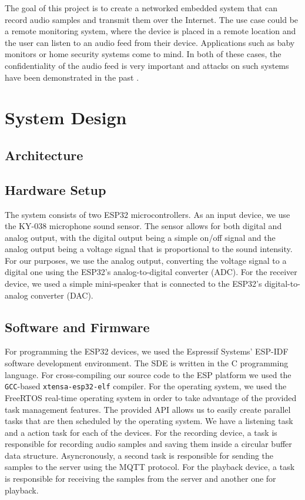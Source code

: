 \documentclass[conference]{IEEEtran}
\begin{document}
The goal of this project is to create a networked embedded system that can record audio samples and transmit them over the Internet.
The use case could be a remote monitoring system, where the device is placed in a remote location and 
the user can listen to an audio feed from their device. Applications such as baby monitors or home security systems come to mind.
In both of these cases, the confidentiality of the audio feed is very important and
attacks on such systems have been demonstrated in the past \cite{BabyMonitorHack, VideoSurvAttacks}.

\section{System Design}
\label{sec:system_design}

\subsection{Architecture}
\subsection{Hardware Setup}
The system consists of two ESP32\cite{ESP32_Manual} microcontrollers.
As an input device, we use the KY-038\cite{KY-038} microphone sound sensor.
The sensor allows for both digital and analog output, with the digital output being a simple
on/off signal and the analog output being a voltage signal that is proportional to the sound intensity.
For our purposes, we use the analog output, converting the voltage signal to a digital one using the
ESP32's analog-to-digital converter (ADC).
For the receiver device, we used a simple mini-speaker that is connected to the ESP32's digital-to-analog converter (DAC).

\subsection{Software and Firmware}

For programming the ESP32 devices, we used the Espressif Systems' ESP-IDF\cite{ESP-IDF}
software development environment. The SDE is written in the C programming 
language. For cross-compiling our source code to the ESP platform we used the \texttt{GCC}-based
\texttt{xtensa-esp32-elf} compiler. 
For the operating system, we used the FreeRTOS\cite{FreeRTOS} real-time operating system
in order to take advantage of the provided task management features.
The provided API allows us to easily create parallel tasks that are then scheduled by the operating system.
We have a listening task and a action task for each of the devices.
For the recording device, a task is responsible for recording audio samples and saving them 
inside a circular buffer data structure. Asyncronously, a second task is responsible for
sending the samples to the server using the MQTT protocol.
For the playback device, a task is responsible for receiving the samples from the server
and another one for playback.
\end{document}
